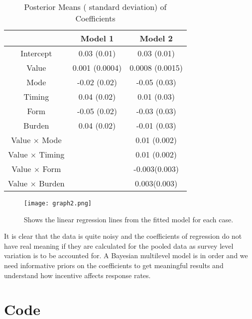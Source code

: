 \documentclass{article}
\begin{document}
\begin{table}[ht]
\caption {Posterior Means ( standard deviation) of Coefficients}
\vspace{2mm}
\def\arraystretch{1.5}
\centering \begin{tabular}{c c c} 
\hline\hline 
\vspace{1mm}
& Model 1 & Model 2   \\ [0.5ex] 
\hline 
Intercept & 0.03 (0.01) & 0.03 (0.01)  \\
Value & 0.001 (0.0004) & 0.0008 (0.0015)\\ 
Mode & -0.02 (0.02) & -0.05 (0.03)  \\
Timing & 0.04 (0.02) & 0.01 (0.03)\\
Form & -0.05 (0.02)& -0.03 (0.03) \\
Burden & 0.04 (0.02) & -0.01 (0.03)\\
Value $\times$ Mode & & 0.01 (0.002)\\
Value $\times$ Timing  & & 0.01 (0.002) \\
Value $\times$ Form&  & -0.003(0.003)\\
Value $\times$ Burden  & & 0.003(0.003)
 \\ [1ex] \hline 
\end{tabular}
\end{table}
 \begin{figure}[H]
\centering
\texttt{[image: graph2.png]}
\caption{Shows the linear regression lines from the fitted model for each case.}
\label{deltat}
\end{figure}
It is clear that the data is quite noisy and the coefficients of regression do not have real meaning if they are calculated for the pooled data as survey level variation is to be accounted for. A Bayesian multilevel model is in order and we need informative  priors on the coefficients to get meaningful results and understand how incentive affects response rates.

\section{Code}
\end{document}
